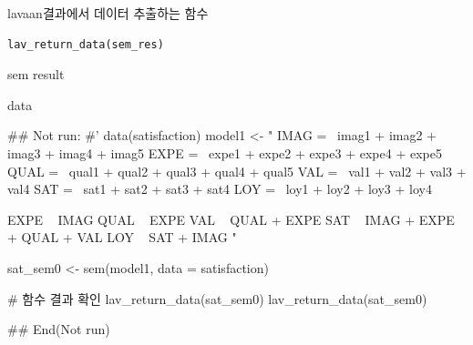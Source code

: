 \documentclass[a4paper]{book}
\begin{document}
%
\begin{Description}
lavaan결과에서 데이터 추출하는 함수
\end{Description}
%
\begin{Usage}
\begin{verbatim}
lav_return_data(sem_res)
\end{verbatim}
\end{Usage}
%
\begin{Arguments}
\begin{ldescription}
\item[\code{sem\_res}] sem result
\end{ldescription}
\end{Arguments}
%
\begin{Value}
data
\end{Value}
%
\begin{Examples}
\begin{ExampleCode}

\#\# Not run: 
#'
data(satisfaction)
model1 <- "
IMAG =~ imag1 + imag2 + imag3 + imag4 + imag5
EXPE =~ expe1 + expe2 + expe3 + expe4 + expe5
QUAL =~ qual1 + qual2 + qual3 + qual4 + qual5
VAL =~ val1 + val2 + val3 + val4
SAT =~ sat1 + sat2 + sat3 + sat4
LOY =~ loy1 + loy2 + loy3 + loy4

EXPE ~ IMAG
QUAL ~ EXPE
VAL ~  QUAL + EXPE
SAT ~ IMAG + EXPE + QUAL + VAL
LOY ~ SAT + IMAG
"

sat_sem0 <- sem(model1, data = satisfaction)

# 함수 결과 확인
lav_return_data(sat_sem0)
lav_return_data(sat_sem0)%

## End(Not run)


\end{ExampleCode}
\end{Examples}
\end{document}
